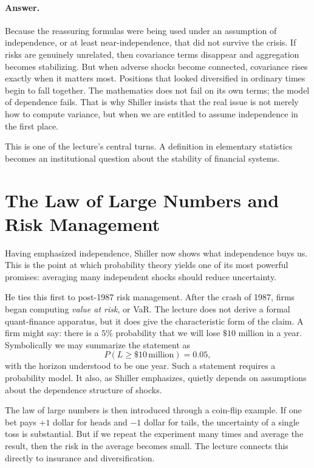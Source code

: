 \paragraph{Answer.}
Because the reassuring formulas were being used under an assumption of independence, or at least near-independence, that did not survive the crisis. If risks are genuinely unrelated, then covariance terms disappear and aggregation becomes stabilizing. But when adverse shocks become connected, covariance rises exactly when it matters most. Positions that looked diversified in ordinary times begin to fall together. The mathematics does not fail on its own terms; the model of dependence fails. That is why Shiller insists that the real issue is not merely how to compute variance, but when we are entitled to assume independence in the first place.

This is one of the lecture's central turns. A definition in elementary statistics becomes an institutional question about the stability of financial systems.

\section{The Law of Large Numbers and Risk Management}

Having emphasized independence, Shiller now shows what independence buys us. This is the point at which probability theory yields one of its most powerful promises: averaging many independent shocks should reduce uncertainty.

He ties this first to post-1987 risk management. After the crash of 1987, firms began computing \emph{value at risk}, or VaR. The lecture does not derive a formal quant-finance apparatus, but it does give the characteristic form of the claim. A firm might say: there is a \(5\%\) probability that we will lose \(\$10\) million in a year. Symbolically we may summarize the statement as
\begin{equation}
P\!\left(L\ge \$10\,\mathrm{million}\right)=0.05,
\end{equation}
with the horizon understood to be one year. Such a statement requires a probability model. It also, as Shiller emphasizes, quietly depends on assumptions about the dependence structure of shocks.

The law of large numbers is then introduced through a coin-flip example. If one bet pays \(+1\) dollar for heads and \(-1\) dollar for tails, the uncertainty of a single toss is substantial. But if we repeat the experiment many times and average the result, then the risk in the average becomes small. The lecture connects this directly to insurance and diversification.

